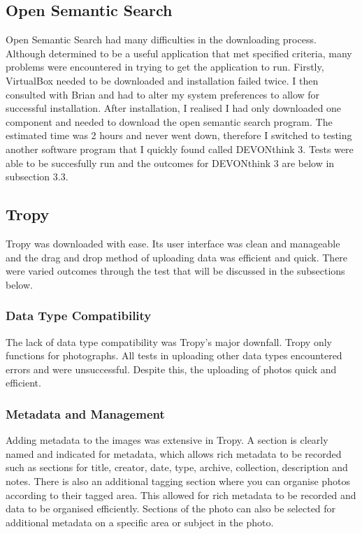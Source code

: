 \documentclass{article}
\begin{document}
\subsection{Open Semantic Search}
Open Semantic Search had many difficulties in the downloading process. Although determined to be a useful application that met specified criteria, many problems were encountered in trying to get the application to run. Firstly, VirtualBox needed to be downloaded and installation failed twice. I then consulted with Brian and had to alter my system preferences to allow for successful installation. After installation, I realised I had only downloaded one component and needed to download the open semantic search program. The estimated time was 2 hours and never went down, therefore I switched to testing another software program that I quickly found called DEVONthink 3. Tests were able to be succesfully run and the outcomes for DEVONthink 3 are below in subsection 3.3. 

\subsection{Tropy}
Tropy was downloaded with ease. Its user interface was clean and manageable and the drag and drop method of uploading data was efficient and quick. There were varied outcomes through the test that will be discussed in the subsections below. 
\subsubsection{Data Type Compatibility}
The lack of data type compatibility was Tropy's major downfall. Tropy only functions for photographs. All tests in uploading other data types encountered errors and were unsuccessful. Despite this, the uploading of photos quick and efficient. 
\subsubsection{Metadata and Management}
Adding metadata to the images was extensive in Tropy. A section is clearly named and indicated for metadata, which allows rich metadata to be recorded such as sections for title, creator, date, type, archive, collection, description and notes. There is also an additional tagging section where you can organise photos according to their tagged area. This allowed for rich metadata to be recorded and data to be organised efficiently. Sections of the photo can also be selected for additional metadata on a specific area or subject in the photo. 
\end{document}
